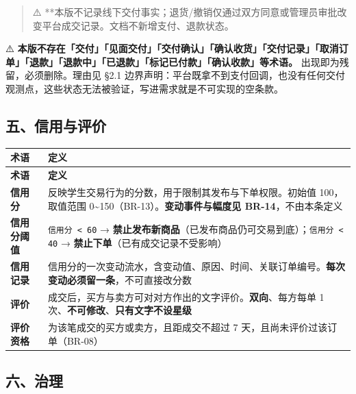 \documentclass[12pt,a4paper]{ctexart}
\begin{document}
\begin{quote}\small
⚠️ **本版不记录线下交付事实；退货/撤销仅通过双方同意或管理员审批改变平台成交记录。文档不新增支付、退款状态。

\end{quote}

⚠️ \textbf{本版不存在「交付」「见面交付」「交付确认」「确认收货」「交付记录」「取消订单」「退款」「退款中」「已退款」「标记已付款」「确认收款」等术语。} 出现即为残留，必须删除。理由见 §2.1 边界声明：平台既拿不到支付回调，也没有任何交付观测点，这些状态无法被验证，写进需求就是不可实现的空条款。


\subsection*{五、信用与评价}

{\footnotesize
\begin{longtable}{|p{2.75cm}|p{13.25cm}|}
\hline
\textbf{术语} & \textbf{定义} \\
\hline
\endfirsthead
\hline
\textbf{术语} & \textbf{定义} \\
\hline
\endhead
\hline
\endfoot
\textbf{信用分} & 反映学生交易行为的分数，用于限制其发布与下单权限。初始值 100，取值范围 0\textasciitilde{}150（BR-13）。\textbf{变动事件与幅度见 BR-14}，不由本条定义 \\
\hline
\textbf{信用分阈值} & \texttt{信用分 < 60} → \textbf{禁止发布新商品}（已发布商品仍可交易到底）；\texttt{信用分 < 40} → \textbf{禁止下单}（已有成交记录不受影响） \\
\hline
\textbf{信用记录} & 信用分的一次变动流水，含变动值、原因、时间、关联订单编号。\textbf{每次变动必须留一条}，不可直接改分数 \\
\hline
\textbf{评价} & 成交后，买方与卖方可对对方作出的文字评价。\textbf{双向}、每方每单 1 次、\textbf{不可修改}、\textbf{只有文字不设星级} \\
\hline
\textbf{评价资格} & 为该笔成交的买方或卖方，且距成交不超过 7 天，且尚未评价过该订单（BR-08） \\
\hline
\end{longtable}
}


\subsection*{六、治理}
\end{document}

